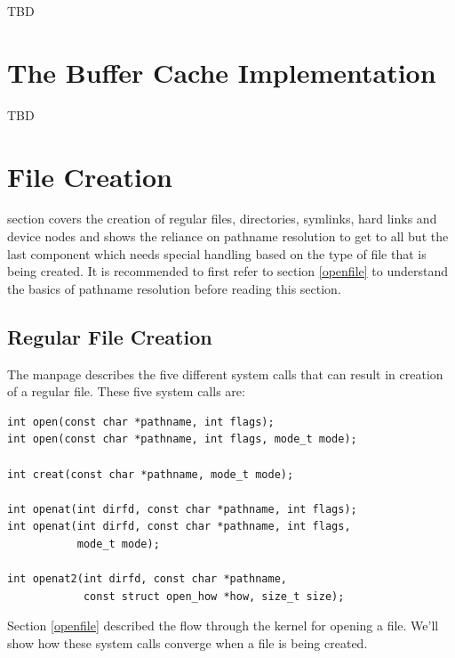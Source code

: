 \noindent
TBD


\section{The Buffer Cache Implementation}\label{vfs-buffer-cache}

TBD


\section{File Creation}

section covers the creation of regular files, directories, symlinks, hard links and device nodes and shows the reliance on pathname resolution to get to all but the last component which needs special handling based on the type of file that is being created. It is recommended to first refer to section \ref{openfile} to understand the basics of pathname resolution before reading this section.


\subsection{Regular File Creation}

The  manpage describes the five different system calls that can result in creation of a regular file. These five system calls are:

\begin{lstlisting}
int open(const char *pathname, int flags);
int open(const char *pathname, int flags, mode_t mode);

int creat(const char *pathname, mode_t mode);

int openat(int dirfd, const char *pathname, int flags);
int openat(int dirfd, const char *pathname, int flags, 
           mode_t mode);

int openat2(int dirfd, const char *pathname,
            const struct open_how *how, size_t size);
\end{lstlisting}

\noindent
Section \ref{openfile} described the flow through the kernel for opening a file. We'll show how these system calls converge when a file is being created.

